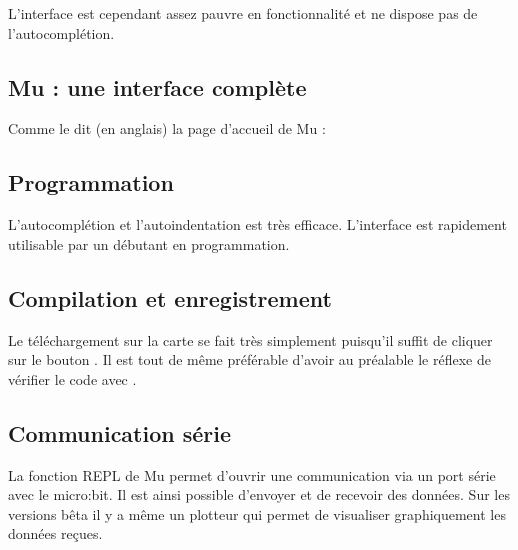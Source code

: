 \documentclass[letterpaper,10pt,french]{sphinxmanual}
\let\sphinxpxdimen\pdfpxdimen\else\newdimen\sphinxpxdimen
\begin{document}
L’interface est cependant assez pauvre en fonctionnalité et ne dispose pas de l’autocomplétion.
\begin{quote}

\end{quote}


\subsection{Mu : une interface complète}
\label{\detokenize{decouverte/prise_en_main_python:mu-une-interface-complete}}
Comme le dit (en anglais) la page d’accueil de Mu :



\subsection{Programmation}
\label{\detokenize{decouverte/prise_en_main_python:programmation}}
L’autocomplétion et l’autoindentation est très efficace. L’interface est rapidement utilisable
par un débutant en programmation.


\subsection{Compilation et enregistrement}
\label{\detokenize{decouverte/prise_en_main_python:compilation-et-enregistrement}}
Le téléchargement sur la carte se fait très simplement puisqu’il suffit de cliquer sur
le bouton \sphinxincludegraphics[width=30\sphinxpxdimen]{{flash}.png} . Il est tout de même préférable d’avoir au préalable le réflexe
de vérifier le code avec \sphinxincludegraphics[width=30\sphinxpxdimen]{{check}.png} .


\subsection{Communication série}
\label{\detokenize{decouverte/prise_en_main_python:communication-serie}}
La fonction REPL de Mu permet d’ouvrir une communication via un port série
avec le micro:bit. Il est ainsi possible d’envoyer et de recevoir des données.
Sur les versions bêta il y a même un plotteur qui permet de visualiser graphiquement les données reçues.
\end{document}
